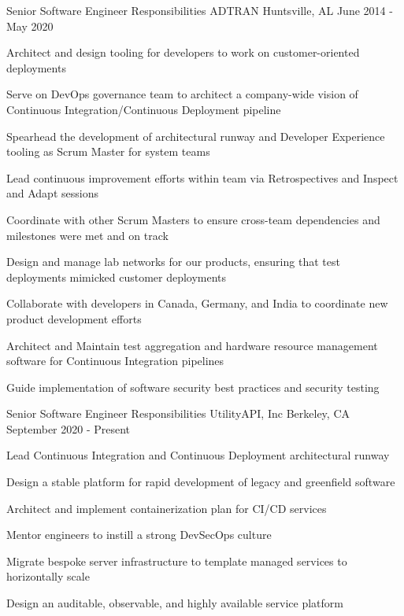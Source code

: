 
\begin{cventries}
  \cventry
    {Senior Software Engineer Responsibilities} %
    {ADTRAN} %
    {Huntsville, AL} %
    {June 2014 - May 2020} %
    {
      \begin{cvitems} %
        \item {Architect and design tooling for developers to work on customer-oriented deployments}
        \item {Serve on DevOps governance team to architect a company-wide vision of Continuous Integration/Continuous Deployment pipeline}
        \item {Spearhead the development of architectural runway and Developer Experience tooling as Scrum Master for system teams}
        \item {Lead continuous improvement efforts within team via Retrospectives and Inspect and Adapt sessions}
        \item {Coordinate with other Scrum Masters to ensure cross-team dependencies and milestones were met and on track}
        \item {Design and manage lab networks for our products, ensuring that test deployments mimicked customer deployments}
        \item {Collaborate with developers in Canada, Germany, and India to coordinate new product development efforts}
        \item {Architect and Maintain test aggregation and hardware resource management software for Continuous Integration pipelines}
        \item {Guide implementation of software security best practices and security testing}
      \end{cvitems}
    }
  \cventry
    {Senior Software Engineer Responsibilities} %
    {UtilityAPI, Inc} %
    {Berkeley, CA} %
    { September 2020 - Present } %
    {
      \begin{cvitems} %
        \item {Lead Continuous Integration and Continuous Deployment architectural runway}
        \item {Design a stable platform for rapid development of legacy and greenfield software}
        \item {Architect and implement containerization plan for CI/CD services}
        \item {Mentor engineers to instill a strong DevSecOps culture}
        \item {Migrate bespoke server infrastructure to template managed services to horizontally scale}
        \item {Design an auditable, observable, and highly available service platform}
      \end{cvitems}
    }

\end{cventries}
